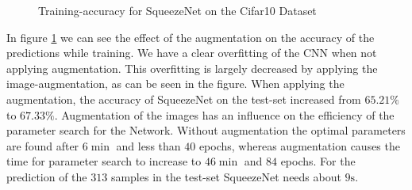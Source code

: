 \documentclass[11pt]{article}
\begin{document}
\begin{figure}
\centering
{}
  \hfill
  \hfill
\caption{Training-accuracy for SqueezeNet on the Cifar10 Dataset}
\label{rescnn::1}
\end{figure}

In figure \ref{rescnn::1} we can see the effect of the augmentation on the accuracy of the predictions while training. We have a clear overfitting of the CNN when not applying augmentation. This overfitting is largely decreased by applying the image-augmentation, as can be seen in the figure. When applying the augmentation, the accuracy of SqueezeNet on the test-set increased from $65.21\%$ to $67.33\%$. Augmentation of the images has an influence on the efficiency of the parameter search for the Network. Without augmentation the optimal parameters are found after $6 \min$ and less than $40$ epochs, whereas augmentation causes the time for parameter search to increase to $46 \min$ and $84$ epochs. For the prediction of the $313$ samples in the test-set SqueezeNet needs about $9 \text{s}$.
\end{document}
